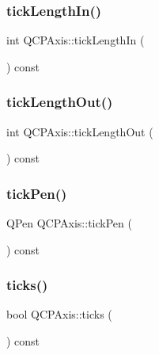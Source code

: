 \subsubsection{\texorpdfstring{tick\+Length\+In()}{tickLengthIn()}}
{\footnotesize\ttfamily int Q\+C\+P\+Axis\+::tick\+Length\+In (\begin{DoxyParamCaption}{ }\end{DoxyParamCaption}) const}

\mbox{\label{class_q_c_p_axis_ad3ba6614ccddf351f133e0acdd4f021e}} 
\subsubsection{\texorpdfstring{tick\+Length\+Out()}{tickLengthOut()}}
{\footnotesize\ttfamily int Q\+C\+P\+Axis\+::tick\+Length\+Out (\begin{DoxyParamCaption}{ }\end{DoxyParamCaption}) const}

\mbox{\label{class_q_c_p_axis_affd022d4f56dfc575b4ced95ad417860}} 
\subsubsection{\texorpdfstring{tick\+Pen()}{tickPen()}}
{\footnotesize\ttfamily Q\+Pen Q\+C\+P\+Axis\+::tick\+Pen (\begin{DoxyParamCaption}{ }\end{DoxyParamCaption}) const\hspace{0.3cm}{\ttfamily [inline]}}

\mbox{\label{class_q_c_p_axis_a5c3da767a2dc990f200856a9e27ea06e}} 
\subsubsection{\texorpdfstring{ticks()}{ticks()}}
{\footnotesize\ttfamily bool Q\+C\+P\+Axis\+::ticks (\begin{DoxyParamCaption}{ }\end{DoxyParamCaption}) const\hspace{0.3cm}{\ttfamily [inline]}}

